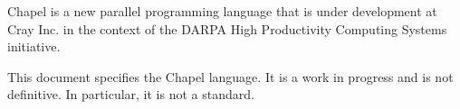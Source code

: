 \label{Scope}

Chapel is a new parallel programming language that is under
development at Cray Inc. in the context of the DARPA High Productivity
Computing Systems initiative.

This document specifies the Chapel language.  It is a work in progress
and is not definitive.  In particular, it is not a standard.
